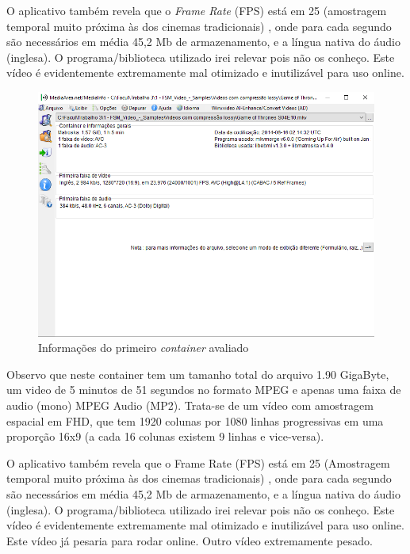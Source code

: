 \paragrafo O aplicativo também revela que o \textit{Frame Rate} (FPS) está em 25 (amostragem temporal muito próxima às dos cinemas tradicionais) , onde para cada segundo são necessários em média 45,2 Mb de armazenamento, e a língua nativa do áudio (inglesa).
O programa/biblioteca utilizado irei relevar pois não os conheço. Este vídeo é evidentemente extremamente mal otimizado e inutilizável para uso online.

\begin{figure}[H]
    \centering
    \caption{Informações do primeiro \textit{container} avaliado}
    \label{fig:imagem2}
    \includegraphics[scale=0.5]{Documeto/1-ElementosTextuais/images/02.png}
    
    \autoriaPropria
\end{figure}

\paragrafo Observo que neste container tem um tamanho total do arquivo 1.90 GigaByte, um video de 5 minutos de 51 segundos no formato MPEG e apenas uma faixa de audio (mono) MPEG Audio (MP2). Trata-se de um vídeo com amostragem espacial em FHD, que tem 1920 colunas por 1080 linhas progressivas em uma proporção 16x9 (a cada 16 colunas existem 9 linhas e vice-versa).

\paragrafo O aplicativo também revela que o Frame Rate (FPS) está em 25 (Amostragem temporal muito próxima às dos cinemas tradicionais) , onde para cada segundo são necessários em média 45,2 Mb de armazenamento, e a língua nativa do áudio (inglesa). O programa/biblioteca utilizado irei relevar pois não os conheço. Este vídeo é evidentemente extremamente mal otimizado e inutilizável para uso online. Este vídeo já pesaria para rodar online. Outro vídeo extremamente pesado.

